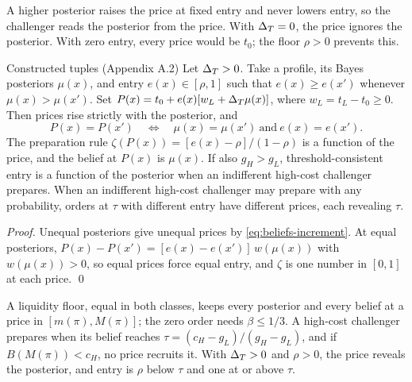 \begin{intuition}
A higher posterior raises the price at fixed entry and never lowers entry, so the challenger reads the posterior from the price. With \(\Delta_T=0\), the price ignores the posterior. With zero entry, every price would be \(t_0\); the floor \(\rho>0\) prevents this.
\end{intuition}

\begin{paperresult}{Constructed tuples (Appendix A.2)}
Let \(\Delta_T>0\). Take a profile, its Bayes posteriors \(\mu(x)\), and entry \(e(x)\in[\rho,1]\) such that \(e(x)\ge e(x')\) whenever \(\mu(x)>\mu(x')\). Set \(P(x)=t_0+e(x)[w_L+\Delta_T\mu(x)]\), where \(w_L=t_L-t_0\ge0\). Then prices rise strictly with the posterior, and
\[
P(x)=P(x')\quad\Longleftrightarrow\quad\mu(x)=\mu(x')\ \text{and}\ e(x)=e(x').
\]
The preparation rule \(\zeta(P(x))=[e(x)-\rho]/(1-\rho)\) is a function of the price, and the belief at \(P(x)\) is \(\mu(x)\). If also \(g_H>g_L\), threshold-consistent entry is a function of the posterior when an indifferent high-cost challenger prepares. When an indifferent high-cost challenger may prepare with any probability, orders at \(\tau\) with different entry have different prices, each revealing \(\tau\).
\end{paperresult}

\emph{Proof.} Unequal posteriors give unequal prices by \eqref{eq:beliefs-increment}. At equal posteriors, \(P(x)-P(x')=[e(x)-e(x')]\,w(\mu(x))\) with \(w(\mu(x))>0\), so equal prices force equal entry, and \(\zeta\) is one number in \([0,1]\) at each price. \qed

\begin{chaptersummary}
A liquidity floor, equal in both classes, keeps every posterior and every belief at a price in \([m(\pi),M(\pi)]\); the zero order needs \(\beta\le1/3\). A high-cost challenger prepares when its belief reaches \(\tau=(c_H-g_L)/(g_H-g_L)\), and if \(B(M(\pi))<c_H\), no price recruits it. With \(\Delta_T>0\) and \(\rho>0\), the price reveals the posterior, and entry is \(\rho\) below \(\tau\) and one at or above \(\tau\).
\end{chaptersummary}
